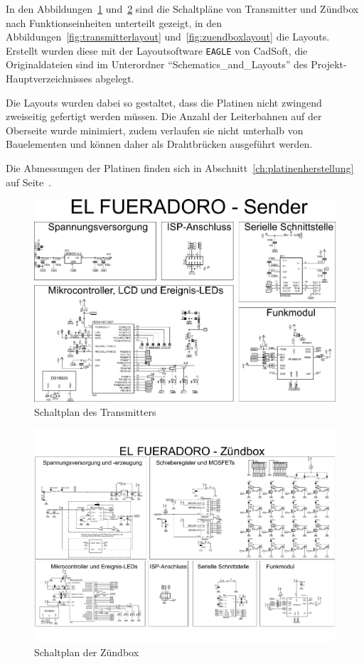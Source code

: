 \documentclass[pdftex, parskip, numbers=noenddot, toc=listof]{scrbook}
\begin{document}
	In den Abbildungen~\ref{fig:transmitterschematic} und~\ref{fig:zuendboxschematic} sind die Schaltpläne von Transmitter und Zündbox nach Funk\-tions\-ein\-heiten unterteilt gezeigt, in den Abbildungen~\ref{fig:transmitterlayout} und~\ref{fig:zuendboxlayout} die Layouts. Erstellt wurden diese mit der Layoutsoftware \texttt{EAGLE} von CadSoft, die Originaldateien sind im Unterordner \enquote{Schematics\_and\_Layouts} des Projekt-Hauptverzeichnisses abgelegt.

	Die Layouts wurden dabei so gestaltet, dass die Platinen nicht zwingend zweiseitig gefertigt werden müssen. Die Anzahl der Leiterbahnen auf der Oberseite wurde minimiert, zudem verlaufen sie nicht unterhalb von Bauelementen und können daher als Drahtbrücken ausgeführt werden.

	Die Abmessungen der Platinen finden sich in Abschnitt~\ref{ch:platinenherstellung} auf Seite~\pageref{ch:platinenherstellung}.

	\begin{figure}
		\centering
		\includegraphics[angle=-90, width=.9\textwidth, keepaspectratio]{Bilder/Transmitterschaltplan}
		\caption{Schaltplan des Transmitters}
		\label{fig:transmitterschematic}
	\end{figure}

	\begin{figure}
		\centering
		\includegraphics[angle=90, height=.95\textheight,keepaspectratio]{Bilder/Zuendboxschaltplan}
		\caption{Schaltplan der Zündbox}
		\label{fig:zuendboxschematic}
	\end{figure}
\end{document}
